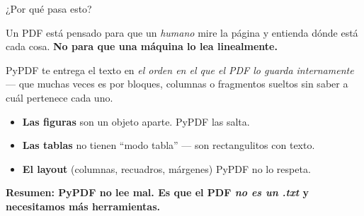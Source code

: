 \documentclass[aspectratio=169, 11pt]{beamer}
\begin{document}
\begin{frame}[shrink]{¿Por qué pasa esto?}
  \vspace{8pt}
  \begin{tcolorbox}[colback=arcaGray, colframe=arcaRed, leftrule=3pt,
    boxrule=0pt, sharp corners, left=8pt, right=8pt, top=6pt, bottom=6pt]
    {\footnotesize\color{arcaDark}
    Un PDF está pensado para que un \emph{humano} mire la página y entienda dónde
    está cada cosa. \textbf{No para que una máquina lo lea linealmente.}\par
    \vspace{4pt}
    PyPDF te entrega el texto en \emph{el orden en el que el PDF lo guarda
    internamente} --- que muchas veces es por bloques, columnas o fragmentos
    sueltos sin saber a cuál pertenece cada uno.}
  \end{tcolorbox}
  \vspace{10pt}
  \begin{itemize}\setlength{\itemsep}{4pt}
    \footnotesize
    \item \textbf{Las figuras} son un objeto aparte. PyPDF las salta.
    \item \textbf{Las tablas} no tienen ``modo tabla'' --- son rectangulitos con texto.
    \item \textbf{El layout} (columnas, recuadros, márgenes) PyPDF no lo respeta.
  \end{itemize}
  \vspace{6pt}
  \begin{tcolorbox}[colback=arcaRed!8, colframe=arcaRed, leftrule=3pt,
    boxrule=0pt, sharp corners, left=8pt, right=8pt, top=3pt, bottom=3pt]
    {\footnotesize\color{arcaDark}\bfseries
    Resumen: PyPDF \textbf{no lee mal}. Es que el PDF \emph{no es un .txt} y
    necesitamos más herramientas.}
  \end{tcolorbox}
\end{frame}
\end{document}
